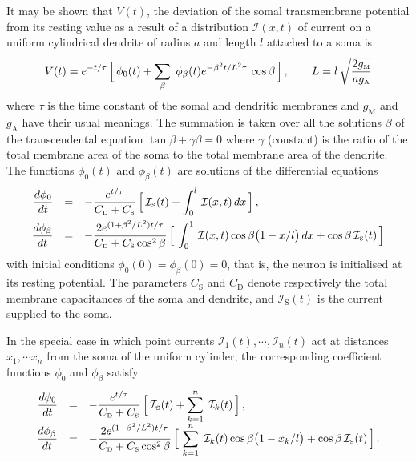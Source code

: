 It may be shown that $V(t)$, the deviation of the somal
transmembrane potential from its resting value as a result of a
distribution $\mathcal{I}(x,t)$ of current on a uniform
cylindrical dendrite of radius $a$ and length $l$ attached to a
soma is
\begin{equation}\label{es4}
V(t)=e^{-t/\tau}\,\Big[\,\phi_0(t)+\sum_\beta\;\phi_\beta(t)
e^{-\beta^2 t/L^2\tau}\,\cos\beta\,\Big]\,, \qquad
L=l\,\sqrt{\displaystyle\frac{2 g_{\mbox{\tiny M}}}{a g_{\mbox{\tiny A}}}}
\end{equation}
where $\tau$ is the time constant of the somal and dendritic
membranes and $g_\mathrm{M}$ and $g_\mathrm{A}$ have their usual
meanings. The summation is taken over all the solutions $\beta$ of
the transcendental equation $\tan\beta+\gamma\beta=0$ where
$\gamma$ (constant) is the ratio of the total membrane area of the
soma to the total membrane area of the dendrite. The functions
$\phi_0(t)$ and $\phi_\beta(t)$ are solutions of the differential
equations
\begin{equation}\label{es9}
\begin{array}{rcl}
\displaystyle\frac{d\phi_0}{dt} & = & -\displaystyle\frac{e^{t/\tau}}
{C_{\mbox{\tiny D}}+C_{\mbox{\tiny S}}}\,\Big[\,
\mathcal{I}_{\mbox{\tiny S}}(t)+\int_0^l\,\mathcal{I}(x,t)\,dx\,\Big]\,,\\[10pt]
\displaystyle\frac{d\phi_\beta}{dt} & = &
-\displaystyle\frac{2e^{(1+\beta^2/L^2)t/\tau}} {C_{\mbox{\tiny D}}
+C_{\mbox{\tiny S}}\cos^2\beta}\,\Big[\,
\int_0^1\,\mathcal{I}(x,t)\cos\beta\big(1-x/l\big)\,dx
+\cos\beta\,\mathcal{I}_{\mbox{\tiny S}}(t)\,\Big]
\end{array}
\end{equation}
with initial conditions $\phi_0(0)=\phi_\beta(0)=0$, that is, the
neuron is initialised at its resting potential. The parameters
$C_\mathrm{S}$ and $C_\mathrm{D}$ denote respectively the total
membrane capacitances of the soma and dendrite, and
$\mathcal{I}_\mathrm{S}(t)$ is the current supplied to the soma.

In the special case in which point currents $\mathcal{I}_1(t),
\cdots,\mathcal{I}_n(t)$ act at distances $x_1,\cdots x_n$ from
the soma of the uniform cylinder, the corresponding coefficient
functions $\phi_0$ and $\phi_\beta$ satisfy
\begin{equation}\label{ec2}
\begin{array}{rcl}
\displaystyle\frac{d\phi_0}{dt} & = &\displaystyle-\frac{e^{t/\tau}}
{C_{\mbox{\tiny D}}+C_{\mbox{\tiny S}}}\,\Big[\,
\mathcal{I}_{\mbox{\tiny S}}(t)+\sum_{k=1}^n\;\mathcal{I}_k(t)\,\Big]\,,\\[10pt]
\displaystyle\frac{d\phi_\beta}{dt} & = &
\displaystyle-\frac{2e^{(1+\beta^2/L^2)t/\tau}}
{C_{\mbox{\tiny D}}+C_{\mbox{\tiny S}}\cos^2\beta}\,\Big[\, \sum_{k=1}^n
\;\mathcal{I}_k(t)\cos\beta\big(1-x_k/l\big)
+\cos\beta\,\mathcal{I}_{\mbox{\tiny S}}(t)\,\Big]\,.
\end{array}
\end{equation}

